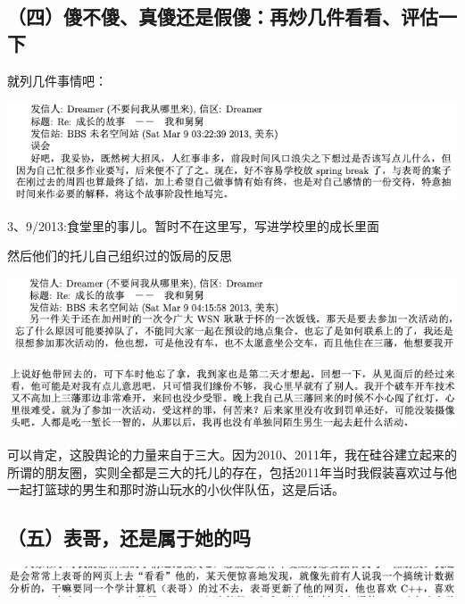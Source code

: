 \documentclass[9pt, b5paper]{article}
\begin{document}
\subsection{（四）傻不傻、真傻还是假傻：再炒几件看看、评估一下}
\label{sec:org5ddc024}

就列几件事情吧：

\begin{center}
\includegraphics[width=.9\linewidth]{./pic/backups_plans_20210424_103008.png}
\end{center}

3、9/2013:食堂里的事儿。暂时不在这里写，写进学校里的成长里面

然后他们的托儿自己组织过的饭局的反思

\begin{center}
\includegraphics[width=.9\linewidth]{./pic/backups_plans_20210424_103043.png}
\end{center}

\begin{center}
\includegraphics[width=.9\linewidth]{./pic/backups_plans_20210424_093212.png}
\end{center}

可以肯定，这股舆论的力量来自于三大。因为2010、2011年，我在硅谷建立起来的所谓的朋友圈，实则全都是三大的托儿的存在，包括2011年当时我假装喜欢过与他一起打篮球的男生和那时游山玩水的小伙伴队伍，这是后话。 

\subsection{（五）表哥，还是属于她的吗}
\label{sec:orgc3c2dc2}

\begin{center}
\includegraphics[width=.9\linewidth]{./pic/backups_plans_20210424_133752.png}
\end{center}
\end{document}
